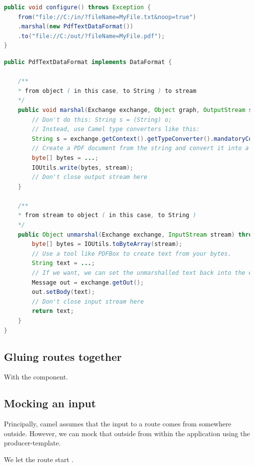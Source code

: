 \begin{lstlisting}[language=java]
public void configure() throws Exception {
    from("file://C:/in/?fileName=MyFile.txt&noop=true")
    .marshal(new PdfTextDataFormat())
    .to("file://C:/out/?fileName=MyFile.pdf");
}
\end{lstlisting}

\begin{lstlisting}[language=java]
public PdfTextDataFormat implements DataFormat {

    /**
    * from object ( in this case, to String ) to stream
    */
    public void marshal(Exchange exchange, Object graph, OutputStream stream) {
        // Don't do this: String s = (String) o;
        // Instead, use Camel type converters like this:
        String s = exchange.getContext().getTypeConverter().mandatoryConvertTo(String.class, graph);
        // Create a PDF document from the string and convert it into a byte array
        byte[] bytes = ...;
        IOUtils.write(bytes, stream);
        // Don't close output stream here
    }
    
    /**
    * from stream to object ( in this case, to String )
    */
    public Object unmarshal(Exchange exchange, InputStream stream) throws Exception {
        byte[] bytes = IOUtils.toByteArray(stream);
        // Use a tool like PDFBox to create text from your bytes.
        String text = ...;
        // If we want, we can set the unmarshalled text back into the exchange's out message
        Message out = exchange.getOut();
        out.setBody(text);
        // Don't close input stream here
        return text;
    }
}
\end{lstlisting}

\subsection{Gluing routes together}

With the   component. 

\subsection{Mocking an input}

Principally, camel assumes that the input to a route comes from somewhere outside. However, we can mock that outside from within the application using the producer-template.

We let the route start . 

